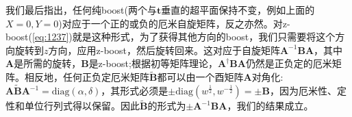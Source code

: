 \documentclass[utf8]{article}
\begin{document}
我们最后指出，任何纯boost(两个与$\mathbf{t}$垂直的超平面保持不变，例如上面的$X =0, Y =0$)对应于一个正的或负的厄米自旋矩阵，反之亦然。对z-boost(\ref{eq:1237})就是这种形式，为了获得其他方向的boost，我们只需要将这个方向旋转到$z$方向，应用z-boost，然后旋转回来。这对应于自旋矩阵$\mathbf{A}^{-1}\mathbf{B}\mathbf{A}$，其中$\mathbf{A}$是所需的旋转，$\mathbf{B}$是z-boost;根据初等矩阵理论，$\mathbf{A}^\dagger \mathbf{B}\mathbf{A}$仍然是正负定的厄米矩阵。相反地，任何正负定厄米矩阵$\tilde{\mathbf{B}}$都可以由一个酉矩阵$\mathbf{A}$对角化:$\mathbf{A}\tilde{\mathbf{B}}\mathbf{A}^{-1}= \text{diag}(\alpha,\delta)$，其形式必须是$\pm \text{diag}(w^{\frac12},w^{-\frac12})=±\mathbf{B}$，因为厄米性、定性和单位行列式得以保留。因此$\tilde{\mathbf{B}}$的形式为$\pm \mathbf{A}^{-1}\mathbf{B}\mathbf{A}$，我们的结果成立。
\end{document}

